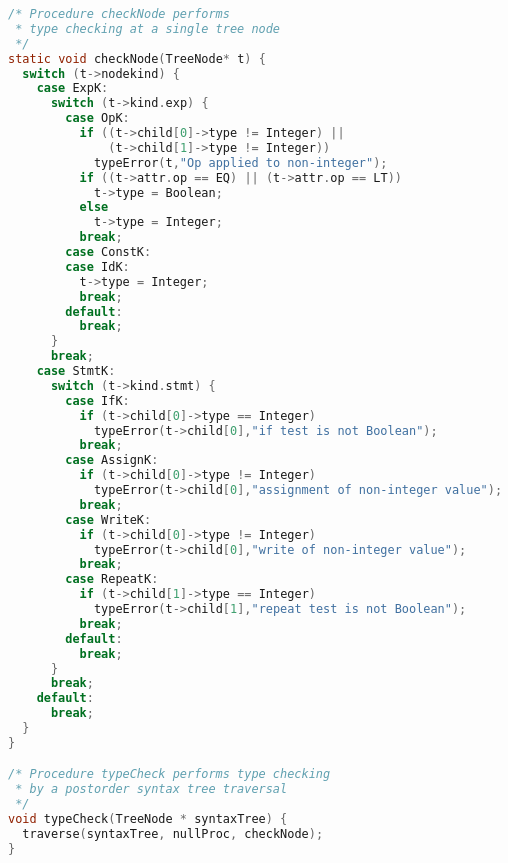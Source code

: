 \documentclass[lang=cn,10pt]{elegantbook}
\begin{document}
\begin{lstlisting}[caption={analyze.c},language=c]
/* Procedure checkNode performs
 * type checking at a single tree node
 */
static void checkNode(TreeNode* t) {
  switch (t->nodekind) {
    case ExpK:
      switch (t->kind.exp) {
        case OpK:
          if ((t->child[0]->type != Integer) ||
              (t->child[1]->type != Integer))
            typeError(t,"Op applied to non-integer");
          if ((t->attr.op == EQ) || (t->attr.op == LT))
            t->type = Boolean;
          else
            t->type = Integer;
          break;
        case ConstK:
        case IdK:
          t->type = Integer;
          break;
        default:
          break;
      }
      break;
    case StmtK:
      switch (t->kind.stmt) {
        case IfK:
          if (t->child[0]->type == Integer)
            typeError(t->child[0],"if test is not Boolean");
          break;
        case AssignK:
          if (t->child[0]->type != Integer)
            typeError(t->child[0],"assignment of non-integer value");
          break;
        case WriteK:
          if (t->child[0]->type != Integer)
            typeError(t->child[0],"write of non-integer value");
          break;
        case RepeatK:
          if (t->child[1]->type == Integer)
            typeError(t->child[1],"repeat test is not Boolean");
          break;
        default:
          break;
      }
      break;
    default:
      break;
  }
}

/* Procedure typeCheck performs type checking 
 * by a postorder syntax tree traversal
 */
void typeCheck(TreeNode * syntaxTree) {
  traverse(syntaxTree, nullProc, checkNode);
}
\end{lstlisting}
\end{document}
